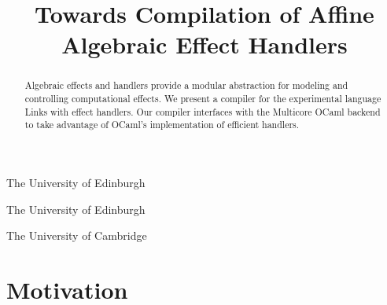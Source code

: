 \documentclass[preprint,numbers]{sigplanconf}
\newcommand{\msgbox}[2]{{%
  \par\noindent\small\color{red}%
  \framebox{\parbox{\dimexpr\linewidth-2\fboxsep-2\fboxrule}{\textbf{#1:} #2}}%
}}
\newcommand{\sam}[1]{\msgbox{Sam}{#1}}
\begin{document}
\makeatletter
\def\@copyrightspace{\relax}
\makeatother

\setlength{\pdfpageheight}{\paperheight}
\setlength{\pdfpagewidth}{\paperwidth}

\newcommand{\camacuk}{@cam.ac.uk}
\newcommand{\edacuk}{@ed.ac.uk}
\newcommand{\contact}[2]{#1@#2}
\newcommand{\reachme}[1]{\hyperlink{mailto:\contact{#1}}{\contact{#1}}}

\preprintfooter{} %

\title{Towards Compilation of Affine Algebraic Effect Handlers}
           {The University of Edinburgh}
           {~}%

           {The University of Edinburgh}
           {~}%

           {The University of Cambridge}
           {~}

\maketitle

\begin{abstract}
  Algebraic effects and handlers provide a modular abstraction for
  modeling and controlling computational effects. We present a
  compiler for the experimental language Links with effect
  handlers. Our compiler interfaces with the Multicore OCaml backend
  to take advantage of OCaml's implementation of efficient handlers.
\end{abstract}

\section{Motivation}

\end{document}

